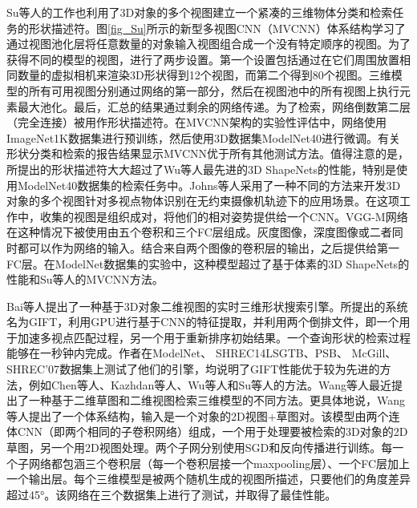 Su等人\cite{Su2015Multi}的工作也利用了3D对象的多个视图建立一个紧凑的三维物体分类和检索任务的形状描述符。图\ref{fig_Su}所示的新型多视图CNN（MVCNN）体系结构学习了通过视图池化层将任意数量的对象输入视图组合成一个没有特定顺序的视图。为了获得不同的模型的视图，进行了两步设置。第一个设置包括通过在它们周围放置相同数量的虚拟相机来渲染3D形状得到12个视图，而第二个得到80个视图。三维模型的所有可用视图分别通过网络的第一部分，然后在视图池中的所有视图上执行元素最大池化。最后，汇总的结果通过剩余的网络传递。为了检索，网络倒数第二层（完全连接）被用作形状描述符。在MVCNN架构的实验性评估中，网络使用ImageNet1K数据集进行预训练，然后使用3D数据集ModelNet40进行微调。有关形状分类和检索的报告结果显示MVCNN优于所有其他测试方法。值得注意的是，所提出的形状描述符大大超过了Wu等人\cite{Wu20143D}最先进的3D ShapeNets的性能，特别是使用ModelNet40数据集的检索任务中。Johns等人\cite{Johns2016Pairwise}采用了一种不同的方法来开发3D对象的多个视图针对多视点物体识别在无约束摄像机轨迹下的应用场景。在这项工作中，收集的视图是组织成对，将他们的相对姿势提供给一个CNN。VGG-M网络\cite{Chatfield2014Return}在这种情况下被使用由五个卷积和三个FC层组成。灰度图像，深度图像或二者同时都可以作为网络的输入。结合来自两个图像的卷积层的输出，之后提供给第一FC层。在ModelNet数据集的实验中，这种模型超过了基于体素的3D ShapeNets\cite{Wu20143D}的性能和Su等人\cite{Su2015Multi}的MVCNN方法。

Bai等人\cite{Bai2016GIFT}提出了一种基于3D对象二维视图的实时三维形状搜索引擎。所提出的系统名为GIFT，利用GPU进行基于CNN的特征提取，并利用两个倒排文件，即一个用于加速多视点匹配过程，另一个用于重新排序初始结果。一个查询形状的检索过程能够在一秒钟内完成。作者在ModelNet、 SHREC14LSGTB\cite{Li2015A}、PSB、 McGill\cite{Siddiqi2008Retrieving}、SHREC'07\cite{Giorgi2008SHape}数据集上测试了他们的引擎，均说明了GIFT性能优于较为先进的方法，例如Chen等人\cite{Chen2003On}、Kazhdan等人\cite{Kazhdan2003Rotation}、Wu等人\cite{Wu20143D}和Su等人\cite{Su2015Multi}的方法。Wang等人\cite{Wang2015Sketch}最近提出了一种基于二维草图和二维视图检索三维模型的不同方法。更具体地说，Wang等人提出了一个体系结构，输入是一个对象的{2D视图+草图}对。该模型由两个连体CNN（即两个相同的子卷积网络）组成，一个用于处理要被检索的3D对象的2D草图，另一个用2D视图处理。两个子网分别使用SGD和反向传播进行训练。每一个子网络都包涵三个卷积层（每一个卷积层接一个maxpooling层）、一个FC层加上一个输出层。每个三维模型是被两个随机生成的视图所描述，只要他们的角度差异超过45°。该网络在三个数据集上进行了测试，并取得了最佳性能。

